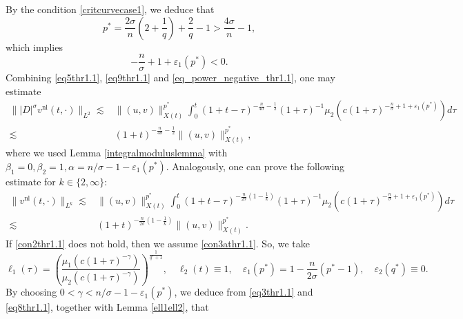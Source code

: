 \documentclass[11pt,reqno]{amsart}
\newcommand{\tron}[1]{\left( #1 \right)}
\numberwithin{equation}{section}
\begin{document}
By the condition \eqref{critcurvecase1}, we deduce that
\[
p^*=\frac{2\sigma}{n}\tron{2+\frac{1}{q}}+\frac{2}{q}-1>\frac{4\sigma}{n}-1,
\]
which implies
\begin{equation}\label{eq_power_negative_thr1.1}
-\frac{n}{\sigma}+1+\varepsilon_1(p^*)<0.
\end{equation}
Combining \eqref{eq5thr1.1}, \eqref{eq9thr1.1} and \eqref{eq_power_negative_thr1.1}, one may estimate
\begin{align}
\big\||D|^{\sigma}v^{\mathrm{nl}}(t, \cdot)\big\|_{L^2} \lesssim & \|(u, v)\|_{X(t)}^{p^*}\int_0^t(1+t-\tau)^{-\frac{n}{4\sigma}-\frac{1}{2}}(1+\tau)^{-1} \mu_2\left(c(1+\tau)^{-\frac{n}{\sigma}+1+\varepsilon_1(p^*)}\right) d \tau\nonumber \\
\lesssim &(1+t)^{-\frac{n}{4\sigma}-\frac{1}{2}}\|(u, v)\|_{X(t)}^{p^*},\label{eq12thr1.1}
\end{align}
where we used Lemma \ref{integralmoduluslemma} with $\beta_1=0, \beta_2=1, \alpha=n/\sigma-1-\varepsilon_1(p^*)$. Analogously, one can prove the following estimate for $k\in\{2,\infty\}$:
\begin{align}
\big\|v^{\mathrm{nl}}(t, \cdot)\big\|_{L^k} \lesssim & \|(u, v)\|_{X(t)}^{p^*}\int_0^t(1+t-\tau)^{-\frac{n}{2\sigma}\tron{1-\frac{1}{k}}}(1+\tau)^{-1} \mu_2\left(c(1+\tau)^{-\frac{n}{\sigma}+1+\varepsilon_1(p^*)}\right) d \tau\nonumber \\
\lesssim &(1+t)^{-\frac{n}{2\sigma}\tron{1-\frac{1}{k}}}\|(u, v)\|_{X(t)}^{p^*}.\label{eq13thr1.1}
\end{align}
\noindent If \eqref{con2thr1.1} does not hold, then we assume \eqref{con3athr1.1}. So, we take
$$
\ell_1(\tau)=\left(\frac{\mu_1\left(c(1+\tau)^{-\gamma}\right)}{\mu_2\left(c(1+\tau)^{-\gamma}\right)}\right)^{\frac{1}{q^*+1}},\quad \ell_2(t)\equiv 1,\quad \varepsilon_1(p^*)=1-\frac{n}{2\sigma}(p^*-1),\quad \varepsilon_2(q^*)\equiv 0.
$$
By choosing $0<\gamma<n/\sigma-1-\varepsilon_1(p^*)$, we deduce from \eqref{eq3thr1.1} and \eqref{eq8thr1.1}, together with Lemma \ref{ell1ell2}, that
\end{document}
